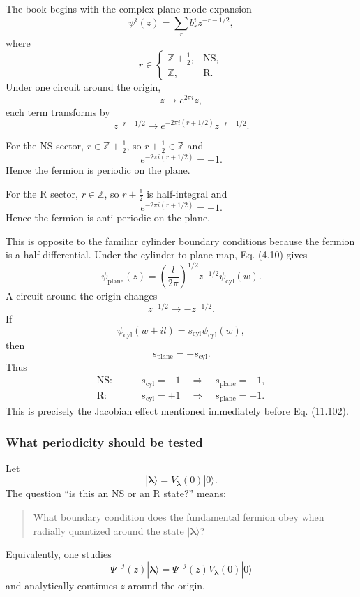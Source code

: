 \documentclass[
  10pt,
  a4paper,
  openany]{book}
\begin{document}
The book begins with the complex-plane mode expansion \[
\psi^i(z)
=
\sum_r b_r^i z^{-r-1/2},
\] where \[
r\in
\begin{cases}
\mathbb Z+\frac12,&\mathrm{NS},\\
\mathbb Z,&\mathrm R.
\end{cases}
\] Under one circuit around the origin, \[
z\longrightarrow e^{2\pi i}z,
\] each term transforms by \[
z^{-r-1/2}
\longrightarrow
e^{-2\pi i(r+1/2)}
z^{-r-1/2}.
\]

For the NS sector, \(r\in\mathbb Z+\tfrac12\), so
\(r+\tfrac12\in\mathbb Z\) and \[
e^{-2\pi i(r+1/2)}=+1.
\] Hence the fermion is periodic on the plane.

For the R sector, \(r\in\mathbb Z\), so \(r+\tfrac12\) is half-integral
and \[
e^{-2\pi i(r+1/2)}=-1.
\] Hence the fermion is anti-periodic on the plane.

This is opposite to the familiar cylinder boundary conditions because
the fermion is a half-differential. Under the cylinder-to-plane map, Eq.
(4.10) gives \[
\psi_{\mathrm{plane}}(z)
=
\left(\frac{l}{2\pi}\right)^{1/2}
z^{-1/2}\psi_{\mathrm{cyl}}(w).
\] A circuit around the origin changes \[
z^{-1/2}\longrightarrow-z^{-1/2}.
\] If \[
\psi_{\mathrm{cyl}}(w+il)
=s_{\mathrm{cyl}}\psi_{\mathrm{cyl}}(w),
\] then \[
s_{\mathrm{plane}}
=-s_{\mathrm{cyl}}.
\] Thus \[
\begin{aligned}
\mathrm{NS}:&\qquad
s_{\mathrm{cyl}}=-1
\quad\Longrightarrow\quad
s_{\mathrm{plane}}=+1,\\%
\mathrm R:&\qquad
s_{\mathrm{cyl}}=+1
\quad\Longrightarrow\quad
s_{\mathrm{plane}}=-1.
\end{aligned}
\] This is precisely the Jacobian effect mentioned immediately before
Eq. (11.102).

\subsubsection{What periodicity should be
tested}\label{what-periodicity-should-be-tested}

Let \[
|\boldsymbol\lambda\rangle
=
V_{\boldsymbol\lambda}(0)|0\rangle.
\] The question ``is this an NS or an R state?'' means:

\begin{quote}
What boundary condition does the fundamental fermion obey when radially
quantized around the state \(|\boldsymbol\lambda\rangle\)?
\end{quote}

Equivalently, one studies \[
\Psi^{\pm j}(z)|\boldsymbol\lambda\rangle
=
\Psi^{\pm j}(z)V_{\boldsymbol\lambda}(0)|0\rangle
\] and analytically continues \(z\) around the origin.
\end{document}
